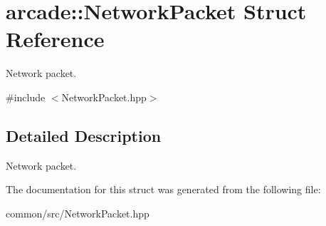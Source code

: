 \hypertarget{structarcade_1_1NetworkPacket}{}\section{arcade\+:\+:Network\+Packet Struct Reference}
\label{structarcade_1_1NetworkPacket}


Network packet.  




{\ttfamily \#include $<$Network\+Packet.\+hpp$>$}



\subsection{Detailed Description}
Network packet. 

The documentation for this struct was generated from the following file\+:\begin{DoxyCompactItemize}
\item 
common/src/Network\+Packet.\+hpp\end{DoxyCompactItemize}
